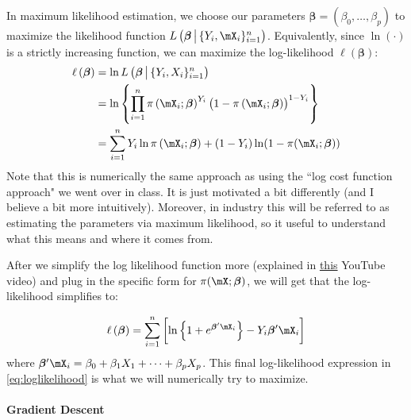 \documentclass[10pt]{article}
\begin{document}
In maximum likelihood estimation, we choose our parameters \(\boldsymbol{\beta} = \left(\beta_0, \dots, \beta_p\right)\) to maximize the likelihood function \(L\left(\boldsymbol{\beta}\,\middle|\,\{Y_i,\mX_i\}_{i=1}^n \right)\). Equivalently, since \(\ln(\cdot)\) is a strictly increasing function, we can maximize the log-likelihood \(\ell(\boldsymbol{\beta})\):
\begin{align*}
	\ell\left(\boldsymbol{\beta}\right) &= \ln L\left(\boldsymbol{\beta}\,\middle|\,\{Y_i,X_i\}_{i=1}^n \right) \\ 
										&= \ln\left\{\prod_{i=1}^n \pi\left(\mX_i;\boldsymbol{\beta}\right)^{Y_i}\left(1 - \pi\left(\mX_i ; \boldsymbol{\beta}\right)\right)^{1-Y_i}\right\} \\
										&= \sum_{i=1}^n Y_i\ln\pi\left(\mX_i ;\boldsymbol{\beta}\right) + (1 - Y_i)\ln(1 - \pi(\mX_i;\boldsymbol{\beta}))
\end{align*}
Note that this is numerically the same approach as using the ``log cost function approach" we went over in class. It is just motivated a bit differently (and I believe a bit more intuitively). Moreover, in industry this will be referred to as estimating the parameters via maximum likelihood, so it useful to understand what this means and where it comes from. 

After we simplify the log likelihood function more (explained in \href{https://www.youtube.com/watch?v=YMJtsYIp4kg&t=351s}{this} YouTube video) and plug in the specific form for \(\pi(\mX;\boldsymbol{\beta})\), we will get that the log-likelihood simplifies to:

\begin{equation}
	\label{eq:loglikelihood}
	\ell\left(\boldsymbol{\beta}\right) = \sum_{i=1}^n \left[\ln\left\{1 + e^{\boldsymbol{\beta}'\mX_i}\right\} - Y_i\boldsymbol{\beta}'\mX_i\right]
\end{equation}
where \(\boldsymbol{\beta}'\mX_i = \beta_0 + \beta_1X_1 + \dots + \beta_p X_p\). This final log-likelihood expression in \eqref{eq:loglikelihood} is what we will numerically try to maximize. 

\paragraph{Gradient Descent}
\end{document}
